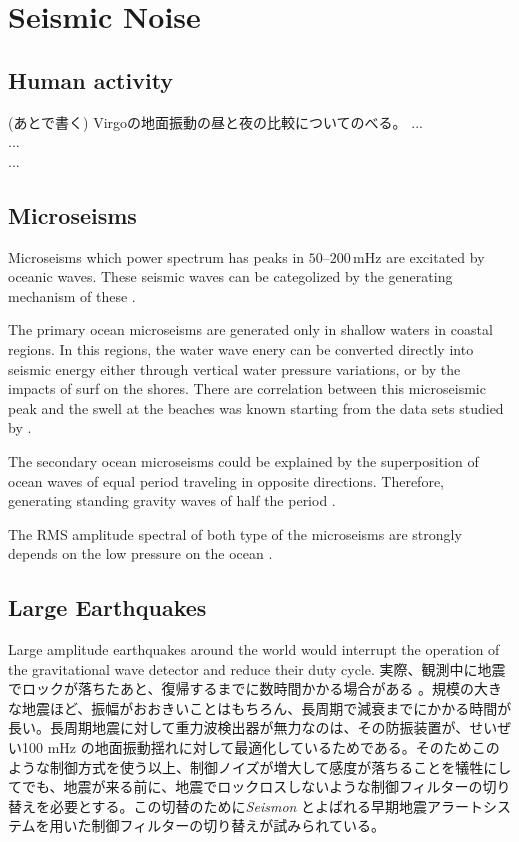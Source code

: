 \section{Seismic Noise}\label{sec:31}
\subsection{Human activity} \label{sec:311}
(あとで書く)
Virgoの地面振動の昼と夜の比較についてのべる。\cite{acernese2004properties}
...\\
...\\
...\\


\subsection{Microseisms} \label{sec:312}
Microseisms which power spectrum has peaks in $50$--$200\,\mathrm{mHz}$ are excitated by oceanic waves. These seismic waves can be categolized by the generating mechanism of these \cite{Bormann2012new}.

The primary ocean microseisms are generated only in shallow waters in coastal regions. In this regions, the water wave enery can be converted directly into seismic energy either through vertical water pressure variations, or by the impacts of surf on the shores. There are correlation between this microseismic peak and the swell at the beaches was known starting from the data sets studied by \cite{haubrich1963comparative}.

The secondary ocean microseisms could be explained by the superposition of ocean waves of equal period traveling in opposite directions. Therefore, generating standing gravity waves of half the period \cite{longuet1950theory}. 

The RMS amplitude spectral of both type of the microseisms are strongly depends on the low pressure on the ocean \cite{naticchioni2014microseismic}.


\subsection{Large Earthquakes} \label{sec:313}

Large amplitude earthquakes around the world would interrupt the operation of the gravitational wave detector and reduce their duty cycle. 実際、観測中に地震でロックが落ちたあと、復帰するまでに数時間かかる場合がある \cite{Coughlin2015real}。規模の大きな地震ほど、振幅がおおきいことはもちろん、長周期で減衰までにかかる時間が長い。長周期地震に対して重力波検出器が無力なのは、その防振装置が、せいぜい100 $\mathrm{mHz}$ の地面振動揺れに対して最適化しているためである\cite{}。そのためこのような制御方式を使う以上、制御ノイズが増大して感度が落ちることを犠牲にしてでも、地震が来る前に、地震でロックロスしないような制御フィルターの切り替えを必要とする。この切替のために\textit{Seismon} とよばれる早期地震アラートシステム\cite{Coughlin2017limiting}を用いた制御フィルターの切り替えが試みられている\cite{Biscans2018control}。

